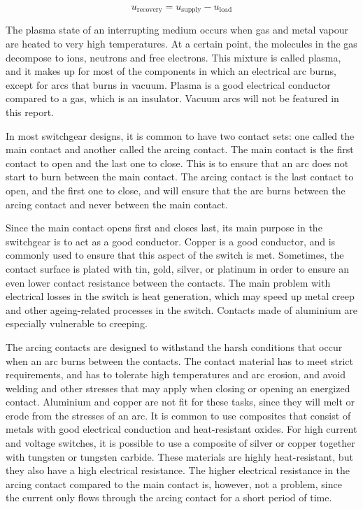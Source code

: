 \documentclass[10pt,b5paper,twoside]{article}
\begin{document}
\begin{equation} \label{eq:U_rec}
u_\mathrm{{recovery}}=u_\mathrm{{supply}}-u_\mathrm{{load}}
\end{equation}  

The plasma state of an interrupting medium occurs when gas and metal vapour are heated to very high temperatures. At a certain point, the molecules in the gas decompose to ions, neutrons and free electrons. This mixture is called plasma, and it makes up for most of the components in which an electrical arc burns, except for arcs that burns in vacuum. Plasma is a good electrical conductor compared to a gas, which is an insulator. Vacuum arcs will not be featured in this report.

In most switchgear designs, it is common to have two contact sets: one called the main contact and another called the arcing contact. The main contact is the first contact to open and the last one to close. This is to ensure that an arc does not start to burn between the main contact. The arcing contact is the last contact to open, and the first one to close, and will ensure that the arc burns between the arcing contact and never between the main contact.

Since the main contact opens first and closes last, its main purpose in the switchgear is to act as a good conductor. Copper is a good conductor, and is commonly used to ensure that this aspect of the switch is met. Sometimes, the contact surface is plated with tin, gold, silver, or platinum in order to ensure an even lower contact resistance between the contacts. The main problem with electrical losses in the switch is heat generation, which may speed up metal creep and other ageing-related processes in the switch. Contacts made of aluminium are especially vulnerable to creeping.

The arcing contacts are designed to withstand the harsh conditions that occur when an arc burns between the contacts. The contact material has to meet strict requirements, and has to tolerate high temperatures and arc erosion, and avoid welding and other stresses that may apply when closing or opening an energized contact. Aluminium and copper are not fit for these tasks, since they will melt or erode from the stresses of an arc. It is common to use composites that consist of metals with good electrical conduction and heat-resistant oxides. For high current and voltage switches, it is possible to use a composite of silver or copper together with tungsten or tungsten carbide. These materials are highly heat-resistant, but they also have a high electrical resistance. The higher electrical resistance in the arcing contact compared to the main contact is, however, not a problem, since the current only flows through the arcing contact for a short period of time.
\end{document}
